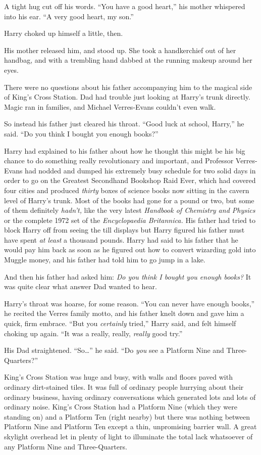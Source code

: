 A tight hug cut off his words. ``You have a good heart,'' his mother
whispered into his ear. ``A very good heart, my son.''

Harry choked up himself a little, then.

His mother released him, and stood up. She took a handkerchief out of
her handbag, and with a trembling hand dabbed at the running makeup
around her eyes.

There were no questions about his father accompanying him to the magical
side of King's Cross Station. Dad had trouble just looking at Harry's
trunk directly. Magic ran in families, and Michael Verres-Evans couldn't
even walk.

So instead his father just cleared his throat. ``Good luck at school,
Harry,'' he said. ``Do you think I bought you enough books?''

Harry had explained to his father about how he thought this might be his
big chance to do something really revolutionary and important, and
Professor Verres-Evans had nodded and dumped his extremely busy schedule
for two solid days in order to go on the Greatest Secondhand Bookshop
Raid Ever, which had covered four cities and produced \emph{thirty}
boxes of science books now sitting in the cavern level of Harry's trunk.
Most of the books had gone for a pound or two, but some of them
definitely \emph{hadn't,} like the very latest \emph{Handbook of
Chemistry and Physics} or the complete 1972 set of the
\emph{Encyclopaedia Britannica.} His father had tried to block Harry off
from seeing the till displays but Harry figured his father must have
spent \emph{at least} a thousand pounds. Harry had said to his father
that he would pay him back as soon as he figured out how to convert
wizarding gold into Muggle money, and his father had told him to go jump
in a lake.

And then his father had asked him: \emph{Do you think I bought you
enough books?} It was quite clear what answer Dad wanted to hear.

Harry's throat was hoarse, for some reason. ``You can never have enough
books,'' he recited the Verres family motto, and his father knelt down
and gave him a quick, firm embrace. ``But you \emph{certainly} tried,''
Harry said, and felt himself choking up again. ``It was a really,
really, \emph{really} good try.''

His Dad straightened. ``So\ldots{}'' he said. ``Do \emph{you} see a
Platform Nine and Three-Quarters?''

King's Cross Station was huge and busy, with walls and floors paved with
ordinary dirt-stained tiles. It was full of ordinary people hurrying
about their ordinary business, having ordinary conversations which
generated lots and lots of ordinary noise. King's Cross Station had a
Platform Nine (which they were standing on) and a Platform Ten (right
nearby) but there was nothing between Platform Nine and Platform Ten
except a thin, unpromising barrier wall. A great skylight overhead let
in plenty of light to illuminate the total lack whatsoever of any
Platform Nine and Three-Quarters.

